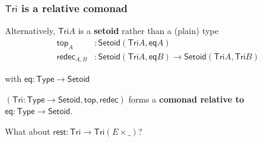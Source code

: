 \documentclass[
]
{beamer}
\newcommand{\constfont}[1]{\ensuremath{\mathsf{#1}}}
\newcommand{\Tri}{\constfont{Tri}}
\newcommand{\head}{\constfont{top}}
\newcommand{\tail}{\constfont{rest}}
\newcommand{\redec}{\constfont{redec}}
\newcommand{\shift}{\constfont{shift}}
\newcommand{\lift}{\constfont{lift}}
\newcommand{\subst}{\constfont{subst}}
\newcommand{\Setoid}{\constfont{Setoid}}
\newcommand{\eq}{\ensuremath{\mathsf{eq}}}
\newcommand{\Abs}{\constfont{abs}}
\newcommand{\Set}{\constfont{Type}}
\newcommand{\fat}[1]{\textbf{#1}}
\begin{document}
\begin{frame}
 \frametitle{$\Tri$ is a relative comonad}
  \begin{block}{Alternatively, $\Tri A$ is a \fat{setoid} rather than a (plain) type}
       \vspace{-2em}
           \begin{align*} 
                 \head_A &: \Setoid(\Tri A, \eq A) \\
                 \redec_{A,B} &: \Setoid(\Tri A,\eq B) \to \Setoid(\Tri A,\Tri B )
           \end{align*}
       
       
             with $\eq : \Set \to \Setoid$

  \end{block}

\pause
  \begin{lemma}
 $(\Tri : \Set\to\Setoid, \head, \redec)$ forms a \fat{comonad relative to} $\eq:\Set\to\Setoid$.
\end{lemma}

\pause
What about $\tail : \Tri \to \Tri(E\times\_)$?

\end{frame}



\begin{comment}
\begin{frame}
 \frametitle{Towards \enquote{coalgebras} for the signature of $\Tri$}
 
  \begin{block}{Goal: define \enquote{coalgebra} s.t.\ $\Tri$ is (the terminal) one}
    More specifically:
    \begin{itemize}
     \item define a notion of \enquote{morphism} for destructor $\tail$
     \item requirement: want to capture interplay of $\tail$ and $\redec$:
       \[\tail\bigl(\redec~f~t\bigr) = \redec\bigl(\lift~f\bigr)(\tail~t)\]
    \end{itemize}
  \end{block}

 \begin{block}{Analogous situation for syntax:}
   For the lambda calculus with monadic substitution:
      \[ \subst~f~(\Abs~t) = \Abs~(\subst~(\shift~f)~t) \]
 \end{block}
\end{frame}
\end{comment}
\end{document}
